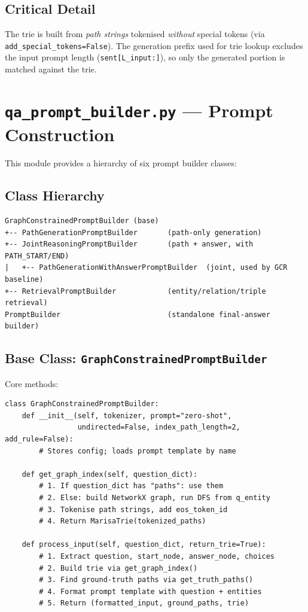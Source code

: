 \documentclass[11pt,a4paper,oneside,openany]{book}
\theoremstyle{definition}
\newcommand{\code}[1]{\texttt{#1}}
\begin{document}
\subsection{Critical Detail}

The trie is built from \emph{path strings} tokenised \emph{without} special tokens (via \code{add\_special\_tokens=False}). The generation prefix used for trie lookup excludes the input prompt length (\code{sent[L\_input:]}), so only the generated portion is matched against the trie.

\section{\texttt{qa\_prompt\_builder.py} --- Prompt Construction}

This module provides a hierarchy of six prompt builder classes:

\subsection{Class Hierarchy}

\begin{verbatim}
GraphConstrainedPromptBuilder (base)
+-- PathGenerationPromptBuilder       (path-only generation)
+-- JointReasoningPromptBuilder       (path + answer, with PATH_START/END)
|   +-- PathGenerationWithAnswerPromptBuilder  (joint, used by GCR baseline)
+-- RetrievalPromptBuilder            (entity/relation/triple retrieval)
PromptBuilder                         (standalone final-answer builder)
\end{verbatim}

\subsection{Base Class: \texttt{GraphConstrainedPromptBuilder}}

Core methods:

\begin{lstlisting}
class GraphConstrainedPromptBuilder:
    def __init__(self, tokenizer, prompt="zero-shot",
                 undirected=False, index_path_length=2, add_rule=False):
        # Stores config; loads prompt template by name

    def get_graph_index(self, question_dict):
        # 1. If question_dict has "paths": use them
        # 2. Else: build NetworkX graph, run DFS from q_entity
        # 3. Tokenise path strings, add eos_token_id
        # 4. Return MarisaTrie(tokenized_paths)

    def process_input(self, question_dict, return_trie=True):
        # 1. Extract question, start_node, answer_node, choices
        # 2. Build trie via get_graph_index()
        # 3. Find ground-truth paths via get_truth_paths()
        # 4. Format prompt template with question + entities
        # 5. Return (formatted_input, ground_paths, trie)
\end{lstlisting}
\end{document}
